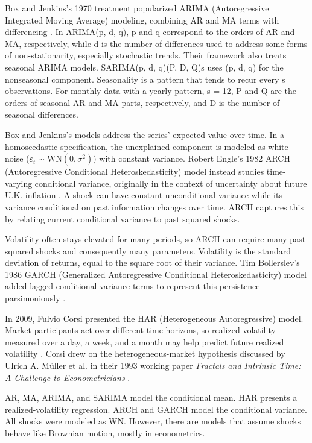 \documentclass[12pt,a4paper]{article}
\numberwithin{equation}{section}
\numberwithin{table}{section}
\numberwithin{figure}{section}
\begin{document}
Box and Jenkins's 1970 treatment popularized ARIMA (Autoregressive Integrated Moving Average) modeling, combining AR and MA terms with differencing \cite{boxjenkins1970}. In ARIMA(p, d, q), p and q correspond to the orders of AR and MA, respectively, while d is the number of differences used to address some forms of non-stationarity, especially stochastic trends. Their framework also treats seasonal ARIMA models. SARIMA(p, d, q)(P, D, Q)s uses (p, d, q) for the nonseasonal component. Seasonality is a pattern that tends to recur every s observations. For monthly data with a yearly pattern, s = 12, P and Q are the orders of seasonal AR and MA parts, respectively, and D is the number of seasonal differences.

Box and Jenkins's models address the series' expected value over time. In a homoscedastic specification, the unexplained component is modeled as white noise ($\varepsilon_t \sim \mathrm{WN}(0, \sigma^2)$) with constant variance. Robert Engle's 1982 ARCH (Autoregressive Conditional Heteroskedasticity) model instead studies time-varying conditional variance, originally in the context of uncertainty about future U.K. inflation \cite{engle1982}. A shock can have constant unconditional variance while its variance conditional on past information changes over time. ARCH captures this by relating current conditional variance to past squared shocks.

Volatility often stays elevated for many periods, so ARCH can require many past squared shocks and consequently many parameters. Volatility is the standard deviation of returns, equal to the square root of their variance. Tim Bollerslev's 1986 GARCH (Generalized Autoregressive Conditional Heteroskedasticity) model added lagged conditional variance terms to represent this persistence parsimoniously \cite{bollerslev1986}.

In 2009, Fulvio Corsi presented the HAR (Heterogeneous Autoregressive) model. Market participants act over different time horizons, so realized volatility measured over a day, a week, and a month may help predict future realized volatility \cite{corsi2009}. Corsi drew on the heterogeneous-market hypothesis discussed by Ulrich A. M\"uller et al. in their 1993 working paper \emph{Fractals and Intrinsic Time: A Challenge to Econometricians} \cite{muller1993}.

AR, MA, ARIMA, and SARIMA model the conditional mean. HAR presents a realized-volatility regression. ARCH and GARCH model the conditional variance. All shocks were modeled as WN. However, there are models that assume shocks behave like Brownian motion, mostly in econometrics. 
\end{document}
